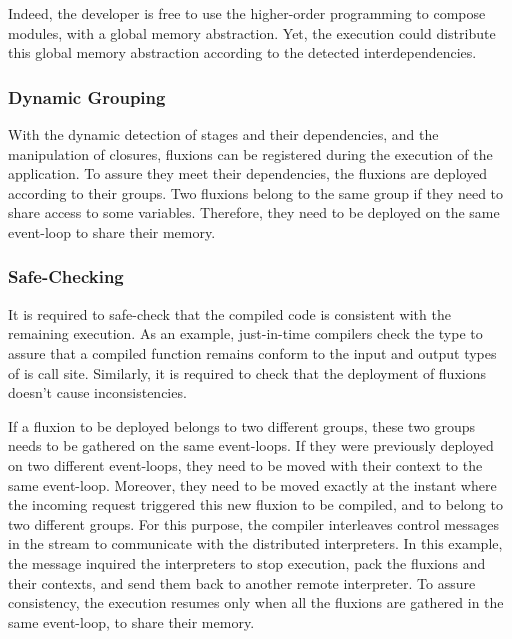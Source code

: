 Indeed, the developer is free to use the higher-order programming to compose modules, with a global memory abstraction.
Yet, the execution could distribute this global memory abstraction according to the detected interdependencies.

\subsubsection{Dynamic Grouping}

With the dynamic detection of stages and their dependencies, and the manipulation of closures, fluxions can be registered during the execution of the application.
To assure they meet their dependencies, the fluxions are deployed according to their groups.
Two fluxions belong to the same group if they need to share access to some variables.
Therefore, they need to be deployed on the same event-loop to share their memory.

\subsubsection{Safe-Checking}

It is required to safe-check that the compiled code is consistent with the remaining execution.
As an example, just-in-time compilers check the type to assure that a compiled function remains conform to the input and output types of is call site.
Similarly, it is required to check that the deployment of fluxions doesn't cause inconsistencies.

If a fluxion to be deployed belongs to two different groups, these two groups needs to be gathered on the same event-loops.
If they were previously deployed on two different event-loops, they need to be moved with their context to the same event-loop.
Moreover, they need to be moved exactly at the instant where the incoming request triggered this new fluxion to be compiled, and to belong to two different groups.
For this purpose, the compiler interleaves control messages in the stream to communicate with the distributed interpreters.
In this example, the message inquired the interpreters to stop execution, pack the fluxions and their contexts, and send them back to another remote interpreter.
To assure consistency, the execution resumes only when all the fluxions are gathered in the same event-loop, to share their memory.


